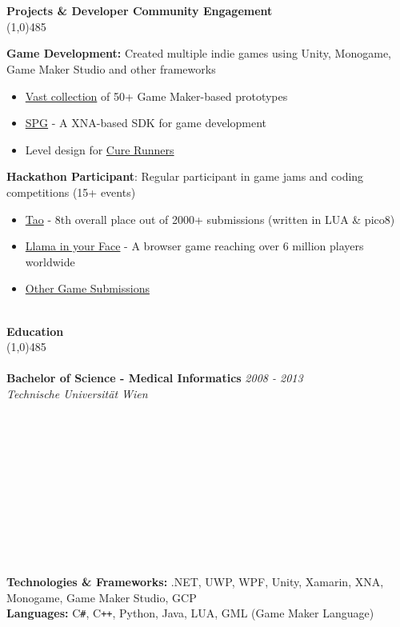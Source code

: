 \documentclass[9pt]{extarticle}
\newcommand\negativespace[1][-0.12cm]{\hspace*{#1}}
\begin{document}
\noindent %
\\
\\
\vspace*{-6pt}
{\negativespace \Large \bf Projects \& Developer Community Engagement}\\
\line(1,0){485}
\\
\noindent

\noindent
\textbf{Game Development:} Created multiple indie games using Unity, Monogame, Game Maker Studio and other frameworks
\begin{itemize}
\item \href{https://github.com/leorean/GMStudio}{Vast collection} of 50+ Game Maker-based prototypes
\item \href{https://github.com/leorean/SPG}{SPG} - A XNA-based SDK for game development
\item Level design for \href{https://ovos.at/de/projekte/cure-runners-ein-spiel-uber-geld-ohne-geld/}{Cure Runners}
\end{itemize}
\textbf{Hackathon Participant}: Regular participant in game jams and coding competitions (15+ events)
\begin{itemize}
\item \href{https://ldjam.com/events/ludum-dare/55/tao}{Tao} - 8th overall place out of 2000+ submissions (written in LUA \& pico8)
\item \href{https://www.newgrounds.com/portal/view/599044}{Llama in your Face} - A browser game reaching over 6 million players worldwide
\item \href{https://ldjam.com/users/leorean/games}{Other Game Submissions}
\end{itemize}

\noindent %
\\
\vspace*{-6pt}
{\negativespace \Large \bf Education}\\
\line(1,0){485}\\
\\
\noindent
{\bf Bachelor of Science - Medical Informatics} \hfill \textit{2008 - 2013} \\
\textit{Technische Universität Wien} \\
\\
\\
\\
\\
\\
\\
\\
\\
\\
\\
\\
\noindent
{\bf Technologies \& Frameworks:} .NET, UWP, WPF, Unity, Xamarin, XNA, Monogame, Game Maker Studio, GCP \\
{\bf Languages:} C\texttt{\#}, C\texttt{++}, Python, Java, LUA, GML (Game Maker Language)
\end{document}
